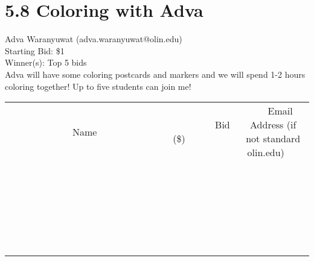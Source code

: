 \documentclass[11pt]{article}
\begin{document}
\section*{5.8 Coloring with Adva}
Adva Waranyuwat (adva.waranyuwat@olin.edu) \\
Starting Bid: \$1 \\
Winner(s): 
Top 5 bids \\
Adva will have some coloring postcards and markers and we will spend 1-2 hours coloring together!  Up to five students can join me! \\[6ex]
\begin{tabular}{c c c}
~~~~~~~~~~~~~Name~~~~~~~~~~~~~ & ~~~~~~~~~Bid (\$)~~~~~~~~~ & ~~~Email Address (if not standard olin.edu)~~~ \\
 & & \\
\hline
 & & \\
\hline
 & & \\
\hline
 & & \\
\hline
 & & \\
\hline
 & & \\
\hline
 & & \\
\hline
 & & \\
\hline
 & & \\
\hline
 & & \\
\hline
 & & \\
\hline
 & & \\
\hline
 & & \\
\hline
 & & \\
\hline
 & & \\
\hline
 & & \\
\hline
 & & \\
\hline
 & & \\
\hline
 & & \\
\hline
 & & \\
\hline
 & & \\
\hline
 & & \\
\hline
 & & \\
\hline
 & & \\
\hline
 & & \\
\hline
 & & \\
\hline
\end{tabular}
\clearpage
\end{document}
